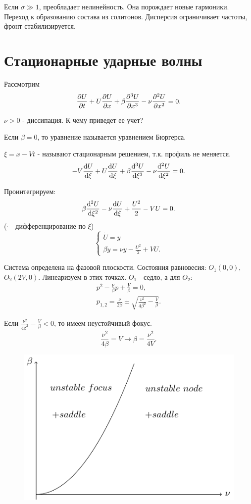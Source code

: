Если  $\sigma \gg 1$, преобладает нелинейность. Она порождает новые гармоники. Переход к образованию состава из солитонов. Дисперсия ограничивает частоты, фронт стабилизируется.

\section{Стационарные ударные волны}
Рассмотрим
\begin{equation}
	\pdv{U}{t}+U\pdv{U}{x}+\beta \pdv[3]{U}{x}-\nu\pdv[2]{U}{x}=0.
	\label{eq:45}
\end{equation}

$\nu>0$ - диссипация. К чему приведет ее учет?

Если $\beta=0$, то уравнение называется уравнением Бюргерса. 

$\xi=x-Vt$ - называют стационарным решением, т.к. профиль не меняется. 
\begin{equation*}
	-V\dv{U}{\xi}+U\dv{U}{\xi}+\beta\dv[3]{U}{\xi}-\nu\dv[2]{U}{\xi}=0.
\end{equation*}

Проинтегрируем:
\begin{equation*}
	\beta\dv[2]{U}{\xi}-\nu \dv{U}{\xi}+\frac{U^2}{2}-VU=0.
\end{equation*}
($\cdot$ - дифференцирование по $\xi$)
\begin{equation}
	\begin{cases}
		\dot{U}=y \\
		\beta \dot{y} =\nu y-\frac{U^2}{2}+VU.		
	\end{cases}
	\label{eq:46}
\end{equation}

Система определена на фазовой плоскости. Состояния равновесия: $O_1(0,0)$, $O_2(2V,0)$. Линеаризуем в этих точках. $O_1$ - седло, а для $O_2$:
\begin{gather*}
	p^2-\frac{\nu}{\beta}p+\frac{V}{\beta}=0, \\ p_{1,2}=\frac{\nu}{2\beta}\pm \sqrt{\frac{\nu^2}{4\beta^2}-\frac{V}{\beta}}.
\end{gather*}

Если $\frac{\nu^2}{4\beta^2}-\frac{V}{\beta}<0$, то имеем неустойчивый фокус.
\begin{equation*}
	\frac{\nu^2}{4\beta}=V \rightarrow \beta=\frac{\nu^2}{4V}.
\end{equation*}
\begin{figure}[H]
	\centering
	\includegraphics[width=0.4\linewidth]{fig/fig27.pdf}   
\end{figure}

